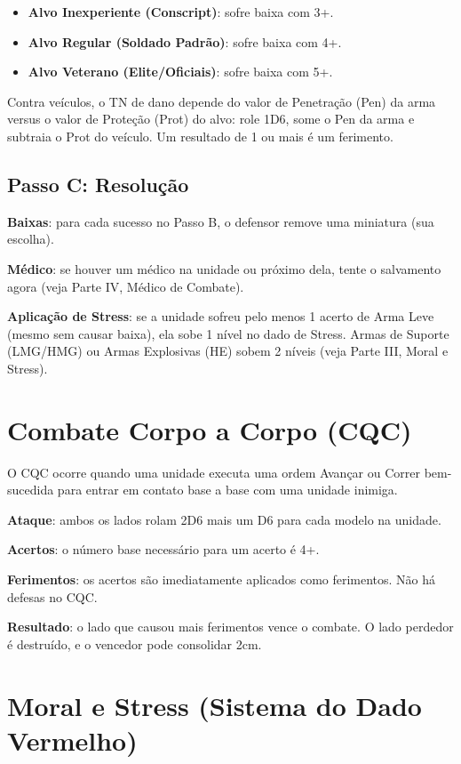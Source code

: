 \begin{itemize}[leftmargin=1.2cm]
  \item \textbf{Alvo Inexperiente (Conscript)}: sofre baixa com 3+.
  \item \textbf{Alvo Regular (Soldado Padrão)}: sofre baixa com 4+.
  \item \textbf{Alvo Veterano (Elite/Oficiais)}: sofre baixa com 5+.
\end{itemize}

Contra veículos, o TN de dano depende do valor de Penetração (Pen) da arma versus o valor de Proteção (Prot) do alvo: role 1D6, some o Pen da arma e subtraia o Prot do veículo. Um resultado de 1 ou mais é um ferimento.

\subsection{Passo C: Resolução}

\textbf{Baixas}: para cada sucesso no Passo B, o defensor remove uma miniatura (sua escolha).

\textbf{Médico}: se houver um médico na unidade ou próximo dela, tente o salvamento agora (veja Parte IV, Médico de Combate).

\textbf{Aplicação de Stress}: se a unidade sofreu pelo menos 1 acerto de Arma Leve (mesmo sem causar baixa), ela sobe 1 nível no dado de Stress. Armas de Suporte (LMG/HMG) ou Armas Explosivas (HE) sobem 2 níveis (veja Parte III, Moral e Stress).

\section{Combate Corpo a Corpo (CQC)}

O CQC ocorre quando uma unidade executa uma ordem Avançar ou Correr bem-sucedida para entrar em contato base a base com uma unidade inimiga.

\textbf{Ataque}: ambos os lados rolam 2D6 mais um D6 para cada modelo na unidade.

\textbf{Acertos}: o número base necessário para um acerto é 4+.

\textbf{Ferimentos}: os acertos são imediatamente aplicados como ferimentos. Não há defesas no CQC.

\textbf{Resultado}: o lado que causou mais ferimentos vence o combate. O lado perdedor é destruído, e o vencedor pode consolidar 2cm.

\section{Moral e Stress (Sistema do Dado Vermelho)}


